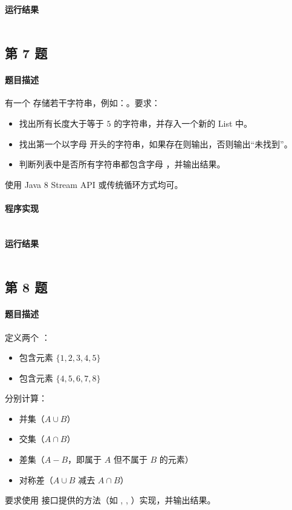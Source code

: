 \documentclass{academics}
\begin{document}
\paragraph{运行结果} {
    \inputminted{text}{../res/P06.out}
}

\subsection{第 7 题}

\paragraph{题目描述} {
    有一个  存储若干字符串，例如：。要求：
    \begin{itemize}
        \item 找出所有长度大于等于 $5$ 的字符串，并存入一个新的 List 中。
        \item 找出第一个以字母  开头的字符串，如果存在则输出，否则输出``未找到''。
        \item 判断列表中是否所有字符串都包含字母 ，并输出结果。
    \end{itemize}
    使用 Java 8 Stream API 或传统循环方式均可。
}

\paragraph{程序实现} {
    \inputminted[label=ListFilter.java]{java}{../src/P07/ListFilter.java}
}

\paragraph{运行结果} {
    \inputminted{text}{../res/P07.out}
}

\subsection{第 8 题}

\paragraph{题目描述} {
    定义两个 ：
    \begin{itemize}
        \item {} 包含元素 $\{ 1, 2, 3, 4, 5 \}$
        \item {} 包含元素 $\{ 4, 5, 6, 7, 8 \}$
    \end{itemize}
    分别计算：
    \begin{itemize}
        \item 并集（$A \cup B$）
        \item 交集（$A \cap B$）
        \item 差集（$A - B$，即属于 $A$ 但不属于 $B$ 的元素）
        \item 对称差（$A \cup B$ 减去 $A \cap B$）
    \end{itemize}
    要求使用  接口提供的方法（如 , , ）实现，并输出结果。
}
\end{document}
